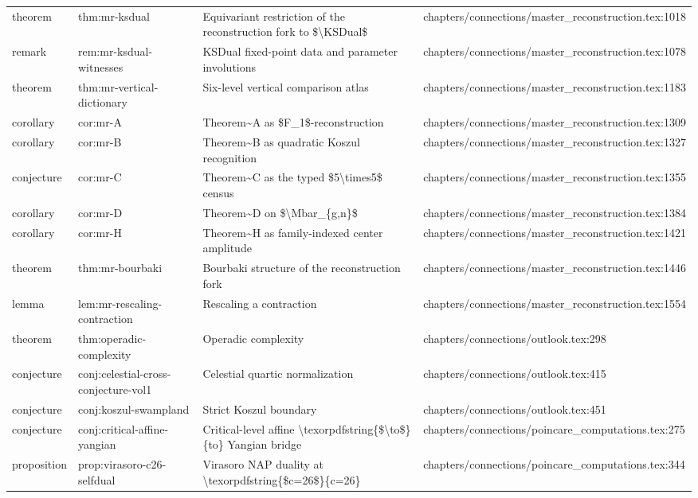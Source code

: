 \documentclass[11pt]{article}
\begin{document}
\begin{longtable}{L{0.10\textwidth}L{0.26\textwidth}L{0.42\textwidth}L{0.22\textwidth}}
theorem & thm:mr-ksdual & Equivariant restriction of the reconstruction fork to \$\textbackslash{}KSDual\$ & chapters/connections/master\_reconstruction.tex:1018\\
remark & rem:mr-ksdual-witnesses & KSDual fixed-point data and parameter involutions & chapters/connections/master\_reconstruction.tex:1078\\
theorem & thm:mr-vertical-dictionary & Six-level vertical comparison atlas & chapters/connections/master\_reconstruction.tex:1183\\
corollary & cor:mr-A & Theorem\textasciitilde{}A as \$F\_1\$-reconstruction & chapters/connections/master\_reconstruction.tex:1309\\
corollary & cor:mr-B & Theorem\textasciitilde{}B as quadratic Koszul recognition & chapters/connections/master\_reconstruction.tex:1327\\
conjecture & cor:mr-C & Theorem\textasciitilde{}C as the typed \$5\textbackslash{}times5\$ census & chapters/connections/master\_reconstruction.tex:1355\\
corollary & cor:mr-D & Theorem\textasciitilde{}D on \$\textbackslash{}Mbar\_\{g,n\}\$ & chapters/connections/master\_reconstruction.tex:1384\\
corollary & cor:mr-H & Theorem\textasciitilde{}H as family-indexed center amplitude & chapters/connections/master\_reconstruction.tex:1421\\
theorem & thm:mr-bourbaki & Bourbaki structure of the reconstruction fork & chapters/connections/master\_reconstruction.tex:1446\\
lemma & lem:mr-rescaling-contraction & Rescaling a contraction & chapters/connections/master\_reconstruction.tex:1554\\
theorem & thm:operadic-complexity & Operadic complexity & chapters/connections/outlook.tex:298\\
conjecture & conj:celestial-cross-conjecture-vol1 & Celestial quartic normalization & chapters/connections/outlook.tex:415\\
conjecture & conj:koszul-swampland & Strict Koszul boundary & chapters/connections/outlook.tex:451\\
conjecture & conj:critical-affine-yangian & Critical-level affine \textbackslash{}texorpdfstring\{\$\textbackslash{}to\$\}\{to\} Yangian bridge & chapters/connections/poincare\_computations.tex:275\\
proposition & prop:virasoro-c26-selfdual & Virasoro NAP duality at \textbackslash{}texorpdfstring\{\$c=26\$\}\{c=26\} & chapters/connections/poincare\_computations.tex:344\\

\end{longtable}
\end{document}
